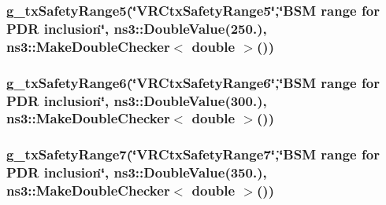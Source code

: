 \subsubsection[{\texorpdfstring{g\+\_\+tx\+Safety\+Range5}{g_txSafetyRange5}}]{ g\+\_\+tx\+Safety\+Range5(\char`\"{}V\+R\+Ctx\+Safety\+Range5\char`\"{},\char`\"{}B\+SM range for P\+DR inclusion\char`\"{}, ns3\+::\+Double\+Value(250.), {\bf ns3\+::\+Make\+Double\+Checker}$<$ double $>$())\hspace{0.3cm}{\ttfamily [static]}}\hypertarget{vanet-routing-compare_8cc_a1f274907a45e3e9daee777fa69e0fefa}{}\label{vanet-routing-compare_8cc_a1f274907a45e3e9daee777fa69e0fefa}
\subsubsection[{\texorpdfstring{g\+\_\+tx\+Safety\+Range6}{g_txSafetyRange6}}]{ g\+\_\+tx\+Safety\+Range6(\char`\"{}V\+R\+Ctx\+Safety\+Range6\char`\"{},\char`\"{}B\+SM range for P\+DR inclusion\char`\"{}, ns3\+::\+Double\+Value(300.), {\bf ns3\+::\+Make\+Double\+Checker}$<$ double $>$())\hspace{0.3cm}{\ttfamily [static]}}\hypertarget{vanet-routing-compare_8cc_a737d92105ce1c40374baf96145cb029c}{}\label{vanet-routing-compare_8cc_a737d92105ce1c40374baf96145cb029c}
\subsubsection[{\texorpdfstring{g\+\_\+tx\+Safety\+Range7}{g_txSafetyRange7}}]{ g\+\_\+tx\+Safety\+Range7(\char`\"{}V\+R\+Ctx\+Safety\+Range7\char`\"{},\char`\"{}B\+SM range for P\+DR inclusion\char`\"{}, ns3\+::\+Double\+Value(350.), {\bf ns3\+::\+Make\+Double\+Checker}$<$ double $>$())\hspace{0.3cm}{\ttfamily [static]}}\hypertarget{vanet-routing-compare_8cc_ac10de320e772d4158f5d1351ab282389}{}\label{vanet-routing-compare_8cc_ac10de320e772d4158f5d1351ab282389}
